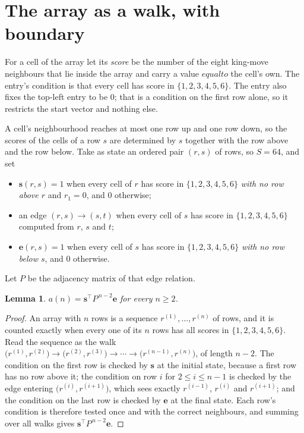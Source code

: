 \documentclass[11pt,a4paper]{article}
\theoremstyle{plain}
\newtheorem{lemma}[theorem]{Lemma}
\theoremstyle{definition}
\begin{document}
\section{The array as a walk, with boundary}

For a cell of the array let its \emph{score} be the number of the eight king-move neighbours that lie inside
the array and carry a value $equal to$ the cell's own. The entry's condition is that every cell
has score in $\{1,2,3,4,5,6\}$. The entry also fixes the top-left entry to be $0$; that is a condition on the first row alone, so it restricts the start vector and nothing else.

A cell's neighbourhood reaches at most one row up and one row down, so the scores of the
cells of a row $s$ are determined by $s$ together with the row above and the row below.
Take as state an ordered pair $(r,s)$ of rows, so $S=64$, and set
\begin{itemize}
\item $\mathbf{s}(r,s)=1$ when every cell of $r$ has score in $\{1,2,3,4,5,6\}$ \emph{with no row
above $r$} and $r_1=0$, and $0$ otherwise;
\item an edge $(r,s)\to(s,t)$ when every cell of $s$ has score in $\{1,2,3,4,5,6\}$ computed from
$r$, $s$ and $t$;
\item $\mathbf{e}(r,s)=1$ when every cell of $s$ has score in $\{1,2,3,4,5,6\}$ \emph{with no row
below $s$}, and $0$ otherwise.
\end{itemize}
Let $P$ be the adjacency matrix of that edge relation.

\begin{lemma}\label{lem:walk}
$a(n)=\mathbf{s}^{\!\top}P^{\,n-2}\mathbf{e}$ for every $n\ge2$.
\end{lemma}

\begin{proof}
An array with $n$ rows is a sequence $r^{(1)},\dots,r^{(n)}$ of rows, and it is counted
exactly when every one of its $n$ rows has all scores in $\{1,2,3,4,5,6\}$. Read the sequence as the
walk $\bigl(r^{(1)},r^{(2)}\bigr)\to\bigl(r^{(2)},r^{(3)}\bigr)\to\cdots\to
\bigl(r^{(n-1)},r^{(n)}\bigr)$, of length $n-2$. The condition on the first row is
checked by $\mathbf{s}$ at the initial state, because a first row has no row above it; the
condition on row $i$ for $2\le i\le n-1$ is checked by the edge entering
$\bigl(r^{(i)},r^{(i+1)}\bigr)$, which sees exactly $r^{(i-1)}$, $r^{(i)}$ and
$r^{(i+1)}$; and the condition on the last row is checked by $\mathbf{e}$ at the final
state. Each row's condition is therefore tested once and with the correct neighbours, and
summing over all walks gives $\mathbf{s}^{\!\top}P^{\,n-2}\mathbf{e}$.
\end{proof}
\end{document}
